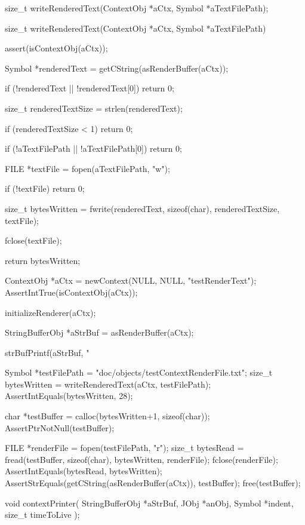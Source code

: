 \startTestSuite[writeRenderedText]

\startCHeader
size_t writeRenderedText(ContextObj *aCtx, Symbol *aTextFilePath);
\stopCHeader

\startCCode
size_t writeRenderedText(ContextObj *aCtx, Symbol *aTextFilePath) {
  assert(isContextObj(aCtx));

  Symbol *renderedText = getCString(asRenderBuffer(aCtx));
  
  if (!renderedText || !renderedText[0]) return 0;
  
  size_t renderedTextSize = strlen(renderedText);

  if (renderedTextSize < 1) return 0;
  
  if (!aTextFilePath || !aTextFilePath[0]) return 0;
  
  FILE *textFile = fopen(aTextFilePath, "w");
  
  if (!textFile) return 0;

  size_t bytesWritten =
    fwrite(renderedText, sizeof(char), renderedTextSize, textFile);
  
  fclose(textFile);
  
  return bytesWritten;
}
\stopCCode


\startCTest
  ContextObj *aCtx = newContext(NULL, NULL, "testRenderText");
  AssertIntTrue(isContextObj(aCtx));
  
  initializeRenderer(aCtx);
  
  StringBufferObj *aStrBuf = asRenderBuffer(aCtx);
  
  strBufPrintf(aStrBuf, "%
  
  Symbol *testFilePath = "doc/objects/testContextRenderFile.txt";
  size_t bytesWritten  = writeRenderedText(aCtx, testFilePath);
  AssertIntEquals(bytesWritten, 28);
  
  char *testBuffer = calloc(bytesWritten+1, sizeof(char));
  AssertPtrNotNull(testBuffer);
  
  FILE *renderFile = fopen(testFilePath, "r");
  size_t bytesRead = fread(testBuffer, sizeof(char), bytesWritten, renderFile);
  fclose(renderFile);
  AssertIntEquals(bytesRead, bytesWritten);
  AssertStrEquals(getCString(asRenderBuffer(aCtx)), testBuffer);
  free(testBuffer);
\stopCTest
\stopTestCase
\stopTestSuite

\startTestSuite[contextPrinter]

\startCHeader
void contextPrinter(
  StringBufferObj *aStrBuf,
  JObj            *anObj,
  Symbol          *indent,
  size_t           timeToLive
);
\stopCHeader

